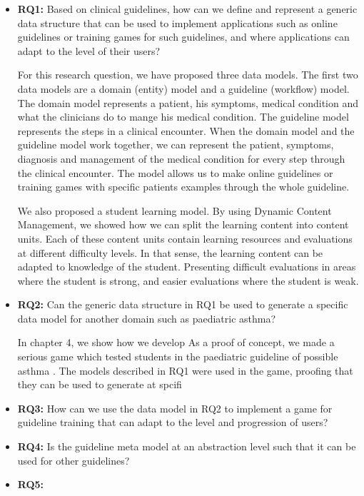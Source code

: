 \begin{itemize}
	\item \textbf{RQ1:} Based on clinical guidelines, how can we define and represent a generic data structure that can be used to implement applications such as online guidelines or training games for such guidelines, and where applications can adapt to the level of their users?
	
	For this research question, we have proposed three data models. The first two data models are a domain (entity) model and a guideline (workflow) model.  The domain model represents a patient, his symptoms, medical condition and what the clinicians do to mange his medical condition. The guideline model represents the steps in a clinical encounter. When the domain model and the guideline model work together, we can represent the patient, symptoms, diagnosis and management of the medical condition for every step through the clinical encounter. The model allows us to make online guidelines or training games with specific patients examples through the whole guideline.
	
	We also proposed a student learning model. By using Dynamic Content Management, we showed how we can split the learning content into content units. Each of these content units contain learning resources and evaluations at different difficulty levels. In that sense, the learning content can be adapted to knowledge of the student. Presenting difficult evaluations in areas where the student is strong, and easier evaluations where the student is weak. 
	
	\item \textbf{RQ2:} Can the generic data structure in RQ1 be used to generate a specific data model for another domain such as paediatric asthma?
	
	In chapter 4, we show how we develop 
	As a proof of concept, we made a serious game which tested students in the paediatric guideline of possible asthma \parencite{RepublicofKeny2016}. The models described in RQ1 were used in the game, proofing that they can be used to generate at spcifi
	
	
	\item \textbf{RQ3:} How can we use the data model in RQ2 to implement a game for guideline training that can adapt to the level and progression  of users?
	\item \textbf{RQ4:} Is the guideline meta model at an abstraction level such that it can be used for other guidelines? 
	\item \textbf{RQ5:}
\end{itemize}



